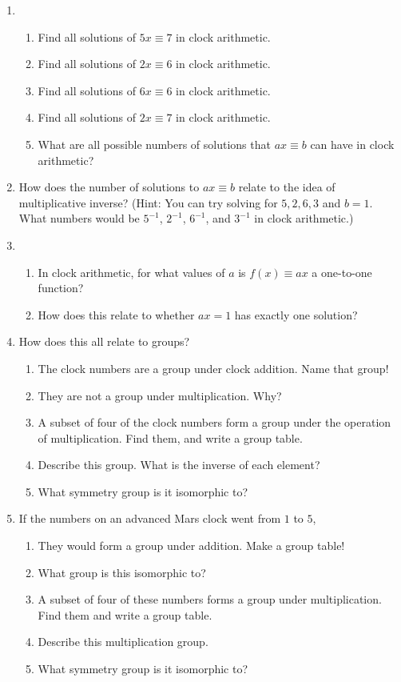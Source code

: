 \documentclass[../gatm.tex]{subfiles}
\begin{document}
\begin{enumerate}
\item \begin{enumerate}
\item Find all solutions of $5x\equiv 7$ in clock arithmetic.
\item Find all solutions of $2x\equiv 6$ in clock arithmetic.
\item Find all solutions of $6x\equiv 6$ in clock arithmetic.
\item Find all solutions of $2x\equiv 7$ in clock arithmetic.
\item What are all possible numbers of solutions that $ax\equiv b$ can have in clock arithmetic?
\end{enumerate}
\item How does the number of solutions to $ax\equiv b$ relate to the idea of multiplicative inverse? (Hint: You can try solving for $5,2,6,3$ and $b=1$. What numbers would be $5^{-1}$, $2^{-1}$, $6^{-1}$, and $3^{-1}$ in clock arithmetic.)
\item \begin{enumerate}
\item In clock arithmetic, for what values of $a$ is $f(x)\equiv ax$ a one-to-one function?
\item How does this relate to whether $ax=1$ has exactly one solution?
\end{enumerate}
\item How does this all relate to groups?
\begin{enumerate}
\item The clock numbers are a group under clock addition. Name that group!
\item They are not a group under multiplication. Why?
\item A subset of four of the clock numbers form a group under the operation of multiplication. Find them, and write a group table.
\item Describe this group. What is the inverse of each element?
\item What symmetry group is it isomorphic to?
\end{enumerate}
\item If the numbers on an advanced Mars clock went from $1$ to $5$,
\begin{enumerate}
\item They would form a group under addition. Make a group table!
\item What group is this isomorphic to?
\item A subset of four of these numbers forms a group under multiplication. Find them and write a group table.
\item Describe this multiplication group.
\item What symmetry group is it isomorphic to?
\end{enumerate}
\end{enumerate}
\end{document}
